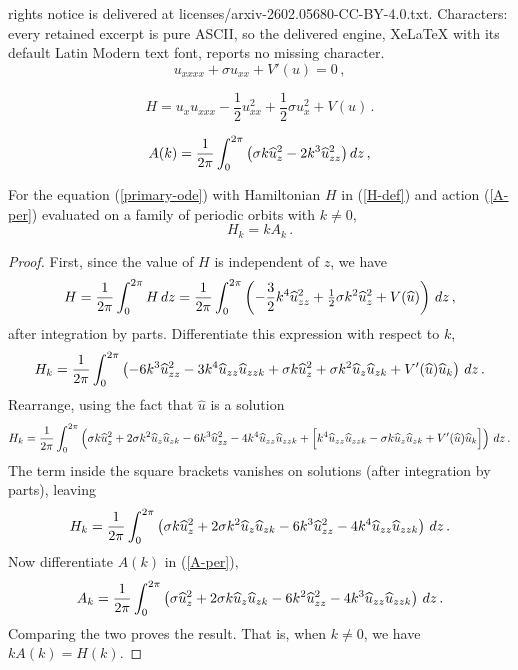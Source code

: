 \documentclass[10pt,a4paper]{amsart}
\def\fr{\mbox{$\frac{1}{2}$}}
\def\rd{{\rm d}} \def\re{{\rm e}} \def\fr{\mbox{$\frac{1}{2}$}}
\def\uh{\widehat {u}} \def\Zh{\widehat {Z}}
\begin{document}
rights notice is delivered at licenses/arxiv-2602.05680-CC-BY-4.0.txt. Characters: every retained excerpt is pure ASCII, so the delivered engine, XeLaTeX with its default Latin Modern text font, reports no missing character.
\begin{equation}\label{primary-ode}
u_{xxxx} + \sigma u_{xx} + V'(u) = 0 \,,
\end{equation}

\begin{equation}\label{H-def}
H = u_xu_{xxx} - \fr u_{xx}^2 + \fr \sigma u_x^2 + V(u)\,.
\end{equation}

\begin{equation}\label{A-per}
  A(k) = \frac{1}{2\pi}\int_0^{2\pi} \big( \sigma k \uh_z^2 - 2k^3 \uh_{zz}^2\big)\,\rd z\,,
\end{equation}

\begin{lem}\label{lemma-Hk} For the equation (\ref{primary-ode}) with Hamiltonian $H$ in (\ref{H-def}) and action (\ref{A-per}) evaluated on a family of periodic orbits with $k\neq0$,
    \begin{equation}\label{HkAk}
H_k = k A_k\,.
\end{equation}
 \end{lem}

\begin{proof}
    First, since the value of $H$ is independent of $z$, we have
%
\begin{equation}\label{Hk-per}
H = \frac{1}{2\pi}\int_0^{2\pi} H\,\rd z =
\frac{1}{2\pi}\int_0^{2\pi} \left( -\frac{3}{2}k^4\uh_{zz}^2+
\fr\sigma k^2 \uh_{z}^2 + V(\uh)\right)\,\rd z \,,
\end{equation}
%
after integration by parts. Differentiate this expression with respect to $k$,
\[
H_k =
\frac{1}{2\pi}\int_0^{2\pi} \left( - 6k^3\uh_{zz}^2
-3k^4\uh_{zz}\uh_{zzk} +\sigma k \uh_{z}^2
+\sigma k^2 \uh_{z}\uh_{zk}+ V'(\uh)\uh_k\right)\,\rd z \,.
\]
Rearrange, using the fact that $\uh$ is a solution
\[
H_k =
\frac{1}{2\pi}\int_0^{2\pi} \left(\sigma k \uh_z^2
+2\sigma k^2 \uh_z\uh_{zk} - 6k^3\uh_{zz}^2 -4k^4\uh_{zz}\uh_{zzk}
+ \Big[k^4 \uh_{zz}\uh_{zzk}- \sigma k \uh_z\uh_{zk}
+ V'(\uh)\uh_k\Big]\right)\,\rd z \,.
\]
The term inside the square brackets vanishes on solutions (after integration by
parts), leaving
\[
H_k =
\frac{1}{2\pi}\int_0^{2\pi} \left(\sigma k \uh_z^2
+2\sigma k^2 \uh_z\uh_{zk} - 6k^3\uh_{zz}^2 -4k^4\uh_{zz}\uh_{zzk}
\right)\,\rd z\,.
\]
Now differentiate $A(k)$ in (\ref{A-per}),
\[
A_k = \frac{1}{2\pi}\int_0^{2\pi}\left(
\sigma \uh_z^2 + 2\sigma k \uh_z\uh_{zk} -6k^2\uh_{zz}^2 - 4k^3\uh_{zz}\uh_{zzk}\right)\,\rd z\,.
\]
Comparing the two proves the result. That is, when $k\neq0$, we have
$kA(k)=H(k)$.
\end{proof}
\end{document}
